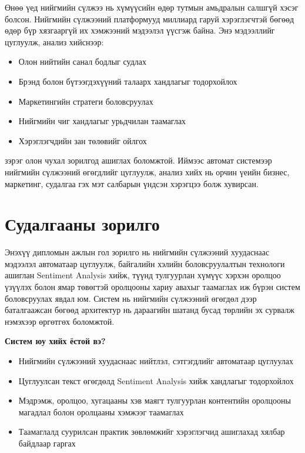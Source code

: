 \documentclass[12pt,a4paper]{report}
\begin{document}
Өнөө үед нийгмийн сүлжээ нь хүмүүсийн өдөр тутмын амьдралын салшгүй хэсэг болсон. Нийгмийн сүлжээний платформууд миллиард гаруй хэрэглэгчтэй бөгөөд өдөр бүр хязгааргүй их хэмжээний мэдээлэл үүсгэж байна. Энэ мэдээллийг цуглуулж, анализ хийснээр:

\begin{itemize}
    \item Олон нийтийн санал бодлыг судлах
    \item Брэнд болон бүтээгдэхүүний талаарх хандлагыг тодорхойлох
    \item Маркетингийн стратеги боловсруулах
    \item Нийгмийн чиг хандлагыг урьдчилан таамаглах
    \item Хэрэглэгчдийн зан төлөвийг ойлгох
\end{itemize}

зэрэг олон чухал зорилгод ашиглах боломжтой. Иймээс автомат системээр нийгмийн сүлжээний өгөгдлийг цуглуулж, анализ хийх нь орчин үеийн бизнес, маркетинг, судалгаа гэх мэт салбарын үндсэн хэрэгцээ болж хувирсан.

\section{Судалгааны зорилго}

Энэхүү дипломын ажлын гол зорилго нь нийгмийн сүлжээний хуудаснаас мэдээлэл автоматаар цуглуулж, байгалийн хэлийн боловсруулалтын технологи ашиглан Sentiment Analysis хийж, түүнд тулгуурлан хүмүүс хэрхэн оролцоо үзүүлэх болон ямар төвөгтэй оролцооны хариу авахыг таамаглах иж бүрэн систем боловсруулах явдал юм. Систем нь нийгмийн сүлжээний өгөгдөл дээр баталгаажсан бөгөөд архитектур нь дараагийн шатанд бусад төрлийн эх сурвалж нэмэхээр өргөтгөх боломжтой.

\textbf{Систем юу хийх ёстой вэ?}
\begin{itemize}
    \item Нийгмийн сүлжээний хуудаснаас нийтлэл, сэтгэгдлийг автоматаар цуглуулах
    \item Цуглуулсан текст өгөгдөлд Sentiment Analysis хийж хандлагыг тодорхойлох
    \item Мэдрэмж, оролцоо, хугацааны хэв маягт тулгуурлан контентийн оролцооны магадлал болон оролцааны хэмжээг таамаглах
    \item Таамаглалд суурилсан практик зөвлөмжийг хэрэглэгчид ашиглахад хялбар байдлаар гаргах
\end{itemize}
\end{document}
